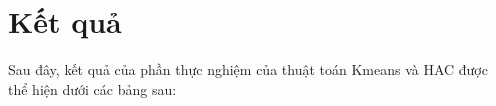 %
%		
%		
%
%
%

\section{Kết quả}
Sau đây, kết quả của phần thực nghiệm của thuật toán Kmeans và HAC được thể hiện dưới các bảng sau:


